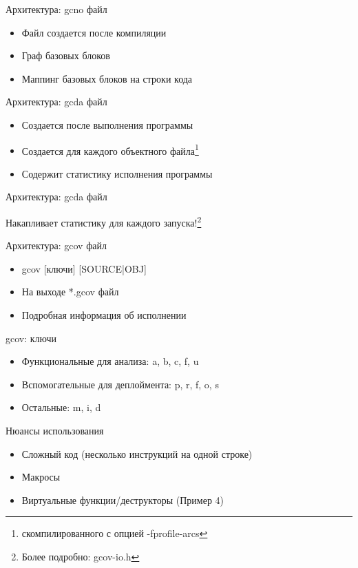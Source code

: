 \begin{frame}{Архитектура: gcno файл}
  \begin{itemize}
    \item Файл создается после компиляции
    \item Граф базовых блоков
    \item Маппинг базовых блоков на строки кода
  \end{itemize}
\end{frame}

\begin{frame}{Архитектура: gcda файл}
  \begin{itemize}
      \item Создается после выполнения программы
      \item Создается для каждого объектного файла\footnote{скомпилированного с опцией -fprofile-arcs}
      \item Содержит статистику исполнения программы
  \end{itemize}
\end{frame}


\begin{frame}{Архитектура: gcda файл}
  \begin{center}
    \large Накапливает статистику для каждого запуска!\footnote{Более подробно: gcov-io.h}
  \end{center}
\end{frame}

\begin{frame}{Архитектура: gcov файл}
  \begin{itemize}
      \item gcov [ключи] [SOURCE|OBJ]
      \item На выходе *.gcov файл
      \item Подробная информация об исполнении
  \end{itemize}
\end{frame}

\begin{frame}{gcov: ключи}
  \begin{itemize}
      \item Функциональные для анализа: a, b, c, f, u
      \item Вспомогательные для деплоймента: p, r, f, o, s
      \item Остальные: m, i, d
  \end{itemize}
\end{frame}

\begin{frame}{Нюансы использования}
  \begin{itemize}
      \item Сложный код (несколько инструкций на одной строке)
      \item Макросы
      \item Виртуальные функции/деструкторы (Пример 4)  
  \end{itemize}
\end{frame}


